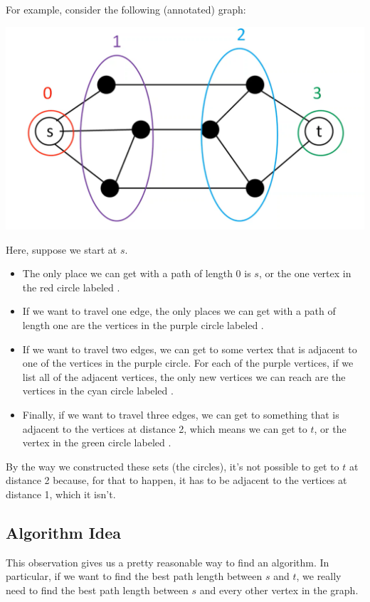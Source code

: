 \documentclass[letterpaper]{article}
\begin{document}
For example, consider the following (annotated) graph:
\begin{center}
    \includegraphics[scale=0.4]{../assets/1_2_3_dist.png}
\end{center}
Here, suppose we start at $s$.
\begin{itemize}
    \item The only place we can get with a path of length 0 is $s$, or the one vertex in the red circle labeled .
    \item If we want to travel one edge, the only places we can get with a path of length one are the vertices in the purple circle labeled .
    \item If we want to travel two edges, we can get to some vertex that is adjacent to one of the vertices in the purple circle. For each of the purple vertices, if we list all of the adjacent vertices, the only new vertices we can reach are the vertices in the cyan circle labeled .
    \item Finally, if we want to travel three edges, we can get to something that is adjacent to the vertices at distance 2, which means we can get to $t$, or the vertex in the green circle labeled . 
\end{itemize}
By the way we constructed these sets (the circles), it's not possible to get to $t$ at distance 2 because, for that to happen, it has to be adjacent to the vertices at distance 1, which it isn't.

\subsection{Algorithm Idea}
This observation gives us a pretty reasonable way to find an algorithm. In particular, if we want to find the best path length between $s$ and $t$, we really need to find the best path length between $s$ and every other vertex in the graph.
\end{document}
